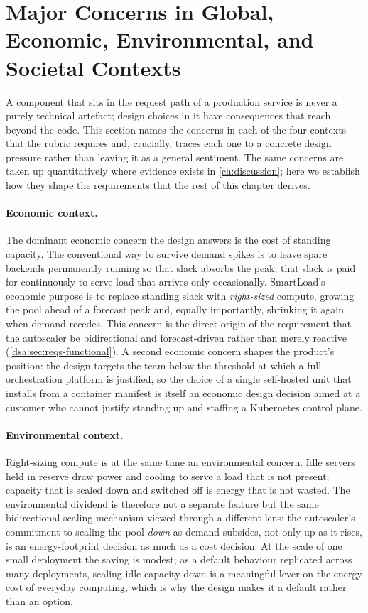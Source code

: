 \section{Major Concerns in Global, Economic, Environmental, and Societal Contexts}
\label{dsa:sec:contexts}

A component that sits in the request path of a production service is never a purely
technical artefact; design choices in it have consequences that reach beyond the
code. This section names the concerns in each of the four contexts that the rubric
requires and, crucially, traces each one to a concrete design pressure rather than
leaving it as a general sentiment. The same concerns are taken up quantitatively
where evidence exists in \cref{ch:discussion}; here we establish how they shape the
requirements that the rest of this chapter derives.

\paragraph{Economic context.}
The dominant economic concern the design answers is the cost of standing capacity.
The conventional way to survive demand spikes is to leave spare backends permanently
running so that slack absorbs the peak; that slack is paid for continuously to serve
load that arrives only occasionally. SmartLoad's economic purpose is to replace
standing slack with \emph{right-sized} compute, growing the pool ahead of a
forecast peak and, equally importantly, shrinking it again when demand recedes. This
concern is the direct origin of the requirement that the autoscaler be bidirectional
and forecast-driven rather than merely reactive (\cref{dsa:sec:reqs-functional}). A
second economic concern shapes the product's position: the design targets the team
below the threshold at which a full orchestration platform is justified, so the
choice of a single self-hosted unit that installs from a container manifest is itself
an economic design decision aimed at a customer who cannot justify standing up and
staffing a Kubernetes control plane.

\paragraph{Environmental context.}
Right-sizing compute is at the same time an environmental concern. Idle servers held
in reserve draw power and cooling to serve a load that is not present; capacity that
is scaled down and switched off is energy that is not wasted. The environmental
dividend is therefore not a separate feature but the same bidirectional-scaling
mechanism viewed through a different lens: the autoscaler's commitment to scaling the
pool \emph{down} as demand subsides, not only up as it rises, is an
energy-footprint decision as much as a cost decision. At the scale of one small
deployment the saving is modest; as a default behaviour replicated across many
deployments, scaling idle capacity down is a meaningful lever on the energy cost of
everyday computing, which is why the design makes it a default rather than an option.

